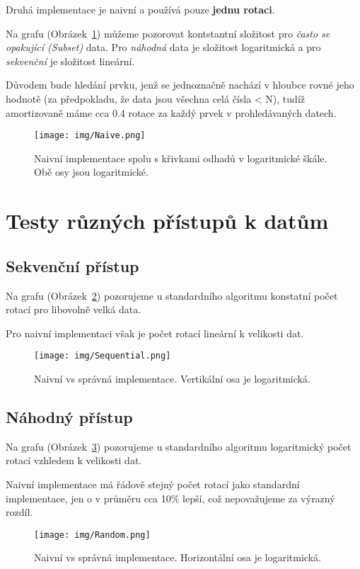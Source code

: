 \documentclass[a4paper]{article}
\begin{document}
    Druhá implementace je naivní a používá pouze \textbf{jednu rotaci}.

	Na grafu (Obrázek~\ref{fig:1_naive}) můžeme pozorovat kontstantní složitost pro \textit{často se opakující (Subset)} data.
	Pro \textit{náhodná} data je složitost logaritmická a pro \textit{sekvenční} je složitost lineární.

	Důvodem bude hledání prvku, jenž se jednoznačně nachází v hloubce rovné jeho hodnotě (za předpokladu, že data jsou všechna celá čísla < N),
	tudíž amortizovaně máme cca 0.4 rotace za každý prvek v prohledávaných datech.

    \begin{figure}[H]
		\centering
		\texttt{[image: img/Naive.png]}
        \caption{Naivní implementace spolu s křivkami odhadů v logaritmické škále. Obě osy jsou logaritmické.}
		\label{fig:1_naive}
	\end{figure}

	\pagebreak
	\section{Testy různých přístupů k datům}
	\subsection{Sekvenční přístup}
	Na grafu (Obrázek~\ref{fig:1_sequential}) pozorujeme u standardního algoritmu konstatní počet rotací pro libovolně velká data.

	Pro naivní implementaci však je počet rotací lineární k velikosti dat.
	\begin{figure}[H]
		\centering
		\texttt{[image: img/Sequential.png]}
        \caption{Naivní vs správná implementace. Vertikální osa je logaritmická.}
		\label{fig:1_sequential}
	\end{figure}


	\pagebreak
	\subsection{Náhodný přístup}
	Na grafu (Obrázek~\ref{fig:1_random}) pozorujeme u standardního algoritmu logaritmický počet rotací vzhledem k velikosti dat.

	Naivní implementace má řádově stejný počet rotací jako standardní implementace, jen o v průměru cca 10\% lepší,
	což nepovažujeme za výrazný rozdíl.
	\begin{figure}[H]
		\centering
		\texttt{[image: img/Random.png]}
        \caption{Naivní vs správná implementace. Horizontální osa je logaritmická.}
		\label{fig:1_random}
	\end{figure}
\end{document}
